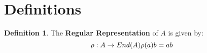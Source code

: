 \documentclass[a4paper]{article}
\theoremstyle{theorem}
\theoremstyle{definition}
\newtheorem{definition}{Definition} [section]
\theoremstyle{remark}
\theoremstyle{gremark}
\theoremstyle{discussion}
\theoremstyle{notation}
\begin{document}
	
	
	
	\section*{Definitions}
	
	
	\begin{definition}
		The \textbf{Regular Representation} of $A$ is given by:
		\begin{equation*}
			\rho: A\to End(A)\medskip
			\rho(a)b=ab
		\end{equation*}
	\end{definition}
	
\end{document}
